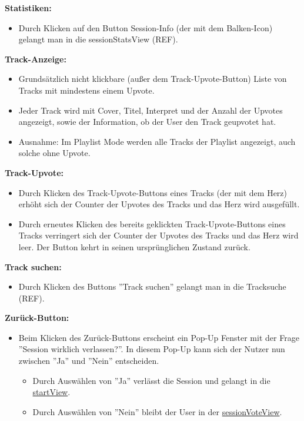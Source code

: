 \documentclass[oneside, ngerman]{sdqtechreport}
\begin{document}
\textbf{Statistiken:}
\begin{itemize}
    \item Durch Klicken auf den Button Session-Info (der mit dem Balken-Icon) gelangt man in die sessionStatsView (REF).
\end{itemize}

\textbf{Track-Anzeige:}
\begin{itemize}
    \item Grundsätzlich nicht klickbare (außer dem Track-Upvote-Button) Liste von Tracks mit mindestens einem Upvote. \item Jeder Track wird mit Cover, Titel, Interpret und der Anzahl der Upvotes angezeigt, sowie der Information, ob der User den Track geupvotet hat.
    \item Ausnahme: Im Playlist Mode werden alle Tracks der Playlist angezeigt, auch solche ohne Upvote.
\end{itemize}

\textbf{Track-Upvote:}
\begin{itemize}
    \item Durch Klicken des Track-Upvote-Buttons eines Tracks (der mit dem Herz) erhöht sich der Counter der Upvotes des Tracks und das Herz wird ausgefüllt.
    \item Durch erneutes Klicken des bereits geklickten Track-Upvote-Buttons eines Tracks verringert sich der Counter der Upvotes des Tracks und das Herz wird leer. Der Button kehrt in seinen ursprünglichen Zustand zurück.
\end{itemize}

\textbf{Track suchen:}
\begin{itemize}
    \item Durch Klicken des Buttons ''Track suchen'' gelangt man in die Tracksuche (REF).
\end{itemize}

\textbf{Zurück-Button:}
\begin{itemize}
    \item Beim Klicken des Zurück-Buttons erscheint ein Pop-Up Fenster mit der Frage ''Session wirklich verlassen?''. In diesem Pop-Up kann sich der Nutzer nun zwischen ''Ja'' und ''Nein'' entscheiden.
    \begin{itemize}
        \item Durch Auswählen von ''Ja'' verlässt die Session und gelangt in die \hyperlink{startView}{startView}.
        \item Durch Auswählen von ''Nein'' bleibt der User in der \hyperlink{sessionVoteView}{sessionVoteView}.
    \end{itemize}
\end{itemize}
\end{document}
